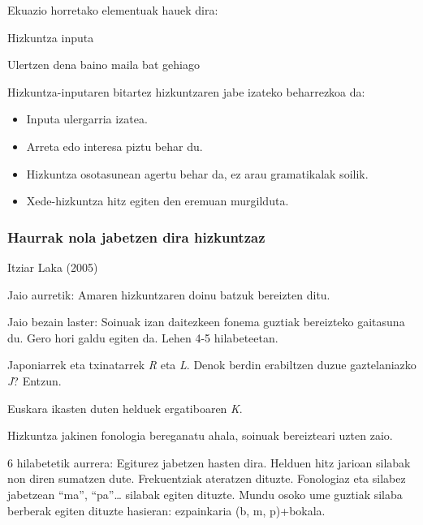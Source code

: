 \documentclass[]{book}
\providecommand{\tightlist}{%
  \setlength{\itemsep}{0pt}\setlength{\parskip}{0pt}}
\begin{document}
Ekuazio horretako elementuak hauek dira:

\begin{description}
\tightlist
\item[I]
Hizkuntza inputa
\item[+1]
Ulertzen dena baino maila bat gehiago
\end{description}

Hizkuntza-inputaren bitartez hizkuntzaren jabe izateko beharrezkoa da:

\begin{itemize}
\tightlist
\item
  Inputa ulergarria izatea.
\item
  Arreta edo interesa piztu behar du.
\item
  Hizkuntza osotasunean agertu behar da, ez arau gramatikalak soilik.
\item
  Xede-hizkuntza hitz egiten den eremuan murgilduta.
\end{itemize}

\hypertarget{haurrak-nola-jabetzen-dira-hizkuntzaz}{%
\subsubsection{Haurrak nola jabetzen dira hizkuntzaz}\label{haurrak-nola-jabetzen-dira-hizkuntzaz}}

Itziar Laka (2005)

Jaio aurretik: Amaren hizkuntzaren doinu batzuk bereizten ditu.

Jaio bezain laster: Soinuak izan daitezkeen fonema guztiak bereizteko gaitasuna du. Gero hori galdu egiten da. Lehen 4-5 hilabeteetan.

\begin{description}
\tightlist
\item[Adibideak]
Japoniarrek eta txinatarrek \emph{R} eta \emph{L}. Denok berdin erabiltzen duzue gaztelaniazko \emph{J}? Entzun.

Euskara ikasten duten helduek ergatiboaren \emph{K}.
\end{description}

Hizkuntza jakinen fonologia bereganatu ahala, soinuak bereizteari uzten zaio.

6 hilabetetik aurrera: Egiturez jabetzen hasten dira. Helduen hitz jarioan silabak non diren sumatzen dute. Frekuentziak ateratzen dituzte. Fonologiaz eta silabez jabetzean ``ma'', ``pa''\ldots{} silabak egiten dituzte. Mundu osoko ume guztiak silaba berberak egiten dituzte hasieran: ezpainkaria (b, m, p)+bokala.
\end{document}
